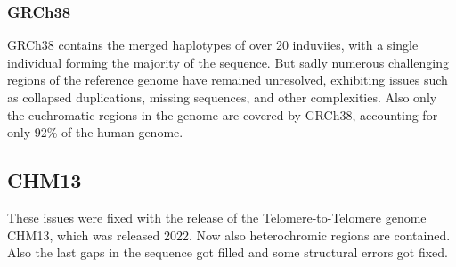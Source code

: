 \documentclass[a4paper,11pt,twoside,openright]{report}
\begin{document}
\subsubsection{GRCh38}
GRCh38 contains the merged haplotypes of over 20 induviies, with a single individual forming the majority of the sequence. \cite{wang2022human}
But sadly numerous challenging regions of the reference genome have remained unresolved, exhibiting issues such as collapsed duplications, missing sequences, and other complexities. \cite{aganezov2022complete} Also only the euchromatic regions in the genome are covered by GRCh38, accounting for only 92\% of the human genome. \cite{nurk2022complete}
\subsection{CHM13}
These issues were fixed with the release of the Telomere-to-Telomere genome CHM13, which was released 2022. Now also heterochromic regions are contained. Also the last gaps in the sequence got filled and some structural errors got fixed. \cite{aganezov2022complete}\cite{nurk2022complete}

\cite{}
\end{document}
